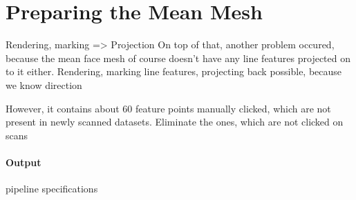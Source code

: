\section{Preparing the Mean Mesh}
Rendering, marking => Projection
On top of that, another problem occured, because the mean face mesh of course doesn't have any line features projected on to it either.
Rendering, marking line features, projecting back possible, because we know direction

However, it contains about 60 feature points manually clicked, which are not present in newly scanned datasets. 
Eliminate the ones, which are not clicked on scans

\paragraph{Output}

pipeline specifications
